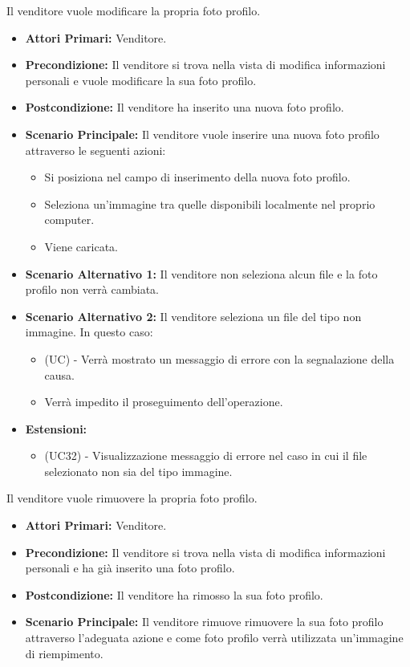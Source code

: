 Il venditore vuole modificare la propria foto profilo.
\begin{itemize}
    \item \textbf{Attori Primari:} Venditore.
    \item \textbf{Precondizione:} Il venditore si trova nella vista di modifica informazioni personali e vuole modificare la sua foto profilo.
    \item \textbf{Postcondizione:} Il venditore ha inserito una nuova foto profilo.
    \item \textbf{Scenario Principale:} Il venditore vuole inserire una nuova foto profilo attraverso le seguenti azioni:
    \begin{itemize}
        \item Si posiziona nel campo di inserimento della nuova foto profilo.
        \item Seleziona un'immagine tra quelle disponibili localmente nel proprio computer.
        \item Viene caricata.
    \end{itemize}
    \item \textbf{Scenario Alternativo 1:} Il venditore non seleziona alcun file e la foto profilo non verrà cambiata.
    \item \textbf{Scenario Alternativo 2:} Il venditore seleziona un file del tipo non immagine. In questo caso:
    \begin{itemize}
        \item (UC) - Verrà mostrato un messaggio di errore con la segnalazione della causa.
        \item Verrà impedito il proseguimento dell'operazione.
    \end{itemize}
    \item \textbf{Estensioni:}
    \begin{itemize}
        \item (UC32) - Visualizzazione messaggio di errore nel caso in cui il file selezionato non sia del tipo immagine.
    \end{itemize}
\end{itemize}

Il venditore vuole rimuovere la propria foto profilo.
\begin{itemize}
    \item \textbf{Attori Primari:} Venditore.
    \item \textbf{Precondizione:} Il venditore si trova nella vista di modifica informazioni personali e ha già inserito una foto profilo.
    \item \textbf{Postcondizione:} Il venditore ha rimosso la sua foto profilo.
    \item \textbf{Scenario Principale:} Il venditore rimuove rimuovere la sua foto profilo attraverso l'adeguata azione e come foto profilo verrà utilizzata un'immagine di riempimento.
\end{itemize}

